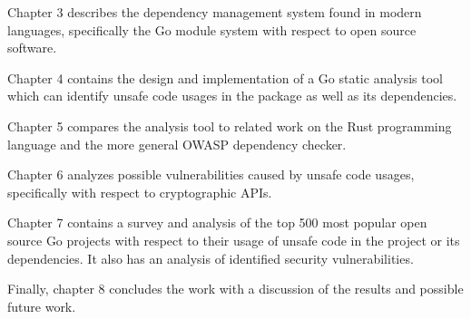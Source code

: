 Chapter 3 describes the dependency management system found in modern languages, specifically
the Go module system with respect to open source software.

Chapter 4 contains the design and implementation of a Go static analysis tool which can identify
unsafe code usages in the package as well as its dependencies.

Chapter 5 compares the analysis tool to related work on the Rust programming language and the
more general OWASP dependency checker.

Chapter 6 analyzes possible vulnerabilities caused by unsafe code usages, specifically with
respect to cryptographic APIs.

Chapter 7 contains a survey and analysis of the top 500 most popular open source Go projects
with respect to their usage of unsafe code in the project or its dependencies. It also has an
analysis of identified security vulnerabilities.

Finally, chapter 8 concludes the work with a discussion of the results and possible future work.